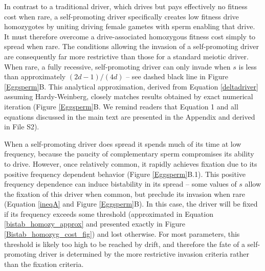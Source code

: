 \documentclass[12pt,letterpaper]{article}
\begin{document}
In contrast to a traditional driver, which drives but pays effectively
	no fitness cost when rare, 
a self-promoting driver specifically creates low fitness drive homozygotes 
	by uniting driving female gametes with sperm enabling that drive.
It must therefore overcome a drive-associated homozygous fitness cost simply to spread when rare. 
The conditions allowing the invasion of a self-promoting driver
 	are consequently far more restrictive than those for a standard meiotic driver.
When rare, a fully recessive, self-promoting driver can only invade when $s$ 
	is less than approximately $(2 d - 1)/(4 d)$ -- see dashed black line in Figure \ref{Eggsperm}B. 
This analytical approximation, derived from Equation \eqref{deltadriver} assuming Hardy-Weinberg, 
	closely matches results obtained by exact numerical iteration (Figure \ref{Eggsperm}B. We remind readers that Equation 1 and all equations discussed in the main text are presented in the Appendix and derived in File S2). \newline 



When a self-promoting driver does spread 
	it spends much of its time at low frequency, 
	because the paucity of complementary sperm compromises its ability to drive. 
However, once relatively common, it  rapidly achieves fixation due to its
	positive frequency dependent behavior (Figure \ref{Eggsperm}B.1).  
This positive frequency dependence can 
	induce bistability in its spread -- some values of $s$ 
	allow the fixation of this driver when common, but 
	preclude its invasion when rare (Equation \ref{ineqA} and Figure \ref{Eggsperm}B). 
In this case, the driver will be fixed if its frequency exceeds some threshold 
	(approximated in Equation \ref{bistab_homozy_approx} and  presented exactly in 
	Figure \ref{Bistab_homozyg_cost_fig}) and lost otherwise. 
For most parameters, this threshold is likely too high to be reached by drift, 
	and therefore  the fate of a self-promoting driver is determined
	by the more restrictive invasion criteria rather than the fixation criteria. \newline 
\end{document}
